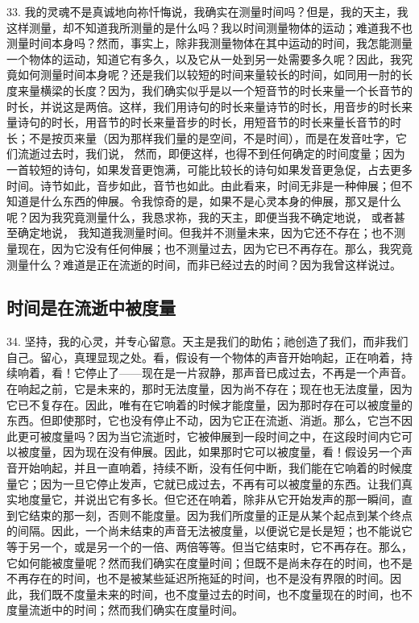 33. 我的灵魂不是真诚地向祢忏悔说，我确实在测量时间吗？但是，我的天主，我这样测量，却不知道我所测量的是什么吗？我以时间测量物体的运动；难道我不也测量时间本身吗？然而，事实上，除非我测量物体在其中运动的时间，我怎能测量一个物体的运动，知道它有多久，以及它从一处到另一处需要多久呢？因此，我究竟如何测量时间本身呢？还是我们以较短的时间来量较长的时间，如同用一肘的长度来量横梁的长度？因为，我们确实似乎是以一个短音节的时长来量一个长音节的时长，并说这是两倍。这样，我们用诗句的时长来量诗节的时长，用音步的时长来量诗句的时长，用音节的时长来量音步的时长，用短音节的时长来量长音节的时长；不是按页来量（因为那样我们量的是空间，不是时间），而是在发音吐字，它们流逝过去时，我们说， 然而，即便这样，也得不到任何确定的时间度量；因为一首较短的诗句，如果发音更饱满，可能比较长的诗句如果发音更急促，占去更多时间。诗节如此，音步如此，音节也如此。由此看来，时间无非是一种伸展；但不知道是什么东西的伸展。令我惊奇的是，如果不是心灵本身的伸展，那又是什么呢？因为我究竟测量什么，我恳求祢，我的天主，即便当我不确定地说， 或者甚至确定地说， 我知道我测量时间。但我并不测量未来，因为它还不存在；也不测量现在，因为它没有任何伸展；也不测量过去，因为它已不再存在。那么，我究竟测量什么？难道是正在流逝的时间，而非已经过去的时间？因为我曾这样说过。\par


\subsection{时间是在流逝中被度量}

34. 坚持，我的心灵，并专心留意。天主是我们的助佑；祂创造了我们，而非我们自己。留心，真理显现之处。看，假设有一个物体的声音开始响起，正在响着，持续响着，看！它停止了——现在是一片寂静，那声音已成过去，不再是一个声音。在响起之前，它是未来的，那时无法度量，因为尚不存在；现在也无法度量，因为它已不复存在。因此，唯有在它响着的时候才能度量，因为那时存在可以被度量的东西。但即使那时，它也没有停止不动，因为它正在流逝、消逝。那么，它岂不因此更可被度量吗？因为当它流逝时，它被伸展到一段时间之中，在这段时间内它可以被度量，因为现在没有伸展。因此，如果那时它可以被度量，看！假设另一个声音开始响起，并且一直响着，持续不断，没有任何中断，我们能在它响着的时候度量它；因为一旦它停止发声，它就已成过去，不再有可以被度量的东西。让我们真实地度量它，并说出它有多长。但它还在响着，除非从它开始发声的那一瞬间，直到它结束的那一刻，否则不能度量。因为我们所度量的正是从某个起点到某个终点的间隔。因此，一个尚未结束的声音无法被度量，以便说它是长是短；也不能说它等于另一个，或是另一个的一倍、两倍等等。但当它结束时，它不再存在。那么，它如何能被度量呢？然而我们确实在度量时间；但既不是尚未存在的时间，也不是不再存在的时间，也不是被某些延迟所拖延的时间，也不是没有界限的时间。因此，我们既不度量未来的时间，也不度量过去的时间，也不度量现在的时间，也不度量流逝中的时间；然而我们确实在度量时间。\par

